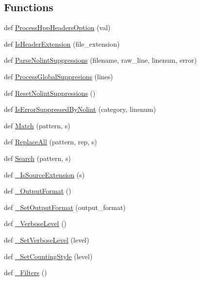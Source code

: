 \subsection*{Functions}
\begin{DoxyCompactItemize}
\item 
def \hyperlink{namespacecpplint_a28e546a8f20e32ef7dcf4ecbecd8b367}{Process\+Hpp\+Headers\+Option} (val)
\item 
def \hyperlink{namespacecpplint_ad4fd5ecbae967884b0a77ee8b3ba1e16}{Is\+Header\+Extension} (file\+\_\+extension)
\item 
def \hyperlink{namespacecpplint_a52ae8f1d9436d14ddb94ceed06026c43}{Parse\+Nolint\+Suppressions} (filename, raw\+\_\+line, linenum, error)
\item 
def \hyperlink{namespacecpplint_a316dc237dc0cde7bafec3c30d5624cac}{Process\+Global\+Suppresions} (lines)
\item 
def \hyperlink{namespacecpplint_a1d92dc3582da477f98ab5b85bd13fea0}{Reset\+Nolint\+Suppressions} ()
\item 
def \hyperlink{namespacecpplint_a0b9e1f991f1a3d02cda3234784241d1f}{Is\+Error\+Suppressed\+By\+Nolint} (category, linenum)
\item 
def \hyperlink{namespacecpplint_a73ac2ecfcd9c52b4a3755176c68dea7e}{Match} (pattern, s)
\item 
def \hyperlink{namespacecpplint_a1b85a5657aeab8b4a0ed85e06aed3576}{Replace\+All} (pattern, rep, s)
\item 
def \hyperlink{namespacecpplint_a75eae6bb88590e904f751502c8ee4bab}{Search} (pattern, s)
\item 
def \hyperlink{namespacecpplint_a0ab5051e7ab04f94927ce195bbb8be3b}{\+\_\+\+Is\+Source\+Extension} (s)
\item 
def \hyperlink{namespacecpplint_ad1c7db6627a6ec1a5ccc44e92df843a9}{\+\_\+\+Output\+Format} ()
\item 
def \hyperlink{namespacecpplint_adad6a57302f9035d199af75eedcce22b}{\+\_\+\+Set\+Output\+Format} (output\+\_\+format)
\item 
def \hyperlink{namespacecpplint_a0bf54de5442c0531c3ead8d7a540d9e0}{\+\_\+\+Verbose\+Level} ()
\item 
def \hyperlink{namespacecpplint_aac1e1c73e40b46a9f9e901756de3e265}{\+\_\+\+Set\+Verbose\+Level} (level)
\item 
def \hyperlink{namespacecpplint_ac20157c72a828b9e9f0548111d6c7dcd}{\+\_\+\+Set\+Counting\+Style} (level)
\item 
def \hyperlink{namespacecpplint_a3dfbd636317204434eec76acd2bb670a}{\+\_\+\+Filters} ()

\end{DoxyCompactItemize}
